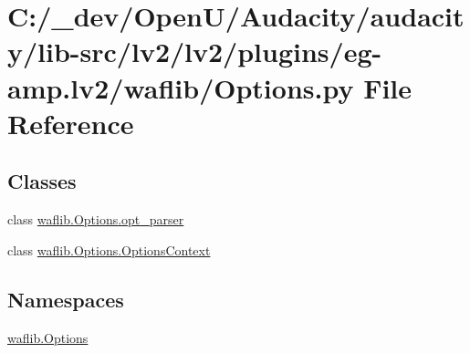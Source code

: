 \hypertarget{lv2_2plugins_2eg-amp_8lv2_2waflib_2_options_8py}{}\section{C\+:/\+\_\+dev/\+Open\+U/\+Audacity/audacity/lib-\/src/lv2/lv2/plugins/eg-\/amp.lv2/waflib/\+Options.py File Reference}
\label{lv2_2plugins_2eg-amp_8lv2_2waflib_2_options_8py}
\subsection*{Classes}
\begin{DoxyCompactItemize}
\item 
class \hyperlink{classwaflib_1_1_options_1_1opt__parser}{waflib.\+Options.\+opt\+\_\+parser}
\item 
class \hyperlink{classwaflib_1_1_options_1_1_options_context}{waflib.\+Options.\+Options\+Context}
\end{DoxyCompactItemize}
\subsection*{Namespaces}
\begin{DoxyCompactItemize}
\item 
 \hyperlink{namespacewaflib_1_1_options}{waflib.\+Options}
\end{DoxyCompactItemize}
